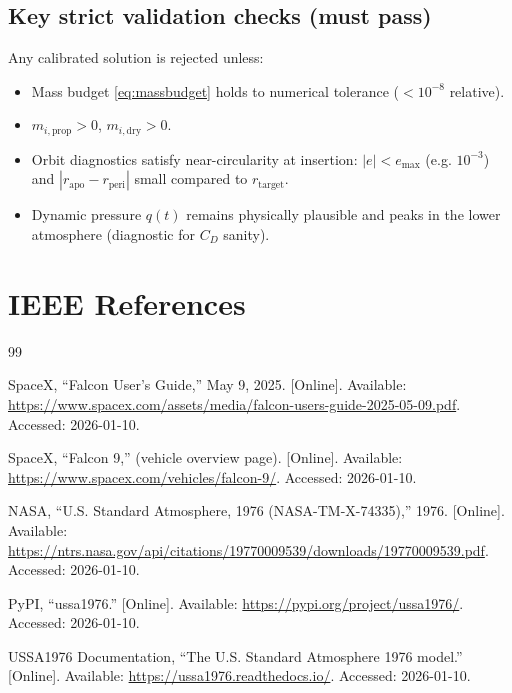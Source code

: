 \documentclass[11pt]{article}
\begin{document}
\subsection{Key strict validation checks (must pass)}
Any calibrated solution is rejected unless:
\begin{itemize}
\item Mass budget \eqref{eq:massbudget} holds to numerical tolerance ($<10^{-8}$ relative).
\item $m_{i,\text{prop}}>0$, $m_{i,\text{dry}}>0$.
\item Orbit diagnostics satisfy near-circularity at insertion:
$|e|<e_{\max}$ (e.g. $10^{-3}$) and $|r_{\text{apo}}-r_{\text{peri}}|$ small compared to $r_{\text{target}}$.
\item Dynamic pressure $q(t)$ remains physically plausible and peaks in the lower atmosphere (diagnostic for $C_D$ sanity).
\end{itemize}


\section{IEEE References}

\begin{thebibliography}{99}

SpaceX, ``Falcon User's Guide,'' May 9, 2025. [Online]. Available: \url{https://www.spacex.com/assets/media/falcon-users-guide-2025-05-09.pdf}. Accessed: 2026-01-10.

SpaceX, ``Falcon 9,'' (vehicle overview page). [Online]. Available: \url{https://www.spacex.com/vehicles/falcon-9/}. Accessed: 2026-01-10.

NASA, ``U.S. Standard Atmosphere, 1976 (NASA-TM-X-74335),'' 1976. [Online]. Available: \url{https://ntrs.nasa.gov/api/citations/19770009539/downloads/19770009539.pdf}. Accessed: 2026-01-10.

PyPI, ``ussa1976.'' [Online]. Available: \url{https://pypi.org/project/ussa1976/}. Accessed: 2026-01-10.

USSA1976 Documentation, ``The U.S. Standard Atmosphere 1976 model.'' [Online]. Available: \url{https://ussa1976.readthedocs.io/}. Accessed: 2026-01-10.

\end{thebibliography}
\end{document}
